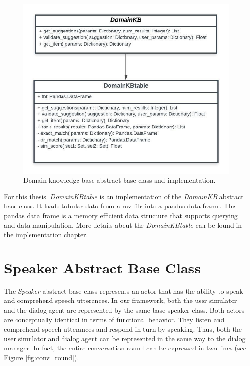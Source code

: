 \begin{figure}[h!]
	\centering
	\includegraphics[scale=.8]{diagrams/domain_kb_class.jpeg}
	\caption{ Domain knowledge base abstract base class and implementation.  }
	\label{fig:domain_kb}
\end{figure}

For this thesis, \textit{DomainKBtable} is an implementation of the \textit{DomainKB} abstract base class. It loads tabular data from a csv file into a pandas data frame. The pandas data frame is a memory efficient data structure that supports querying and data manipulation. More details about the \textit{DomainKBtable} can be found in the implementation chapter. 

\section{Speaker Abstract Base Class}
\label{sssec:speaker}

The \textit{Speaker} abstract base class represents an actor that has the ability to speak and comprehend speech utterances. In our framework, both the user simulator and the dialog agent are represented by the same base speaker class. Both actors are conceptually identical in terms of functional behavior. They listen and comprehend speech utterances and respond in turn by speaking. Thus, both the user simulator and dialog agent can be represented in the same way to the dialog manager. In fact, the entire conversation round can be expressed in two lines (see Figure \ref{fig:conv_round}).

